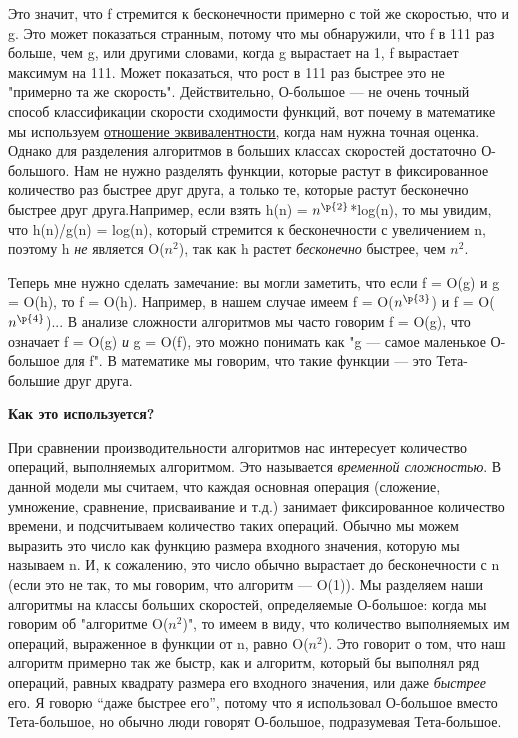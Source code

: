 \vspace{\baselineskip}
Это значит, что f стремится к бесконечности примерно с той же скоростью, что и g. Это может показаться странным, потому что мы обнаружили, что f в 111 раз больше, чем g, или другими словами, когда g вырастает на 1, f вырастает максимум на 111. Может показаться, что рост в 111 раз быстрее это не "примерно та же скорость". Действительно, О-большое --- не очень точный способ классификации скорости сходимости функций, вот почему в математике мы используем \href{https://en.wikipedia.org/wiki/Asymptotic_analysis}{\underline{отношение эквивалентности}}, когда нам нужна точная оценка. Однако для разделения алгоритмов в больших классах скоростей достаточно О-большого. Нам не нужно разделять функции, которые растут в фиксированное количество раз быстрее друг друга, а только те, которые растут бесконечно быстрее друг друга.Например, если взять h(n) = $n^{\p{2}}$*log(n), то мы увидим, что h(n)/g(n) = log(n), который стремится к бесконечности с увеличением n, поэтому h \textit{не} является O($n^{2}$), так как h растет \textit{бесконечно} быстрее, чем $n^{2}$.

\vspace{\baselineskip}
Теперь мне нужно сделать замечание: вы могли заметить, что если f = O(g) и g = O(h), то f = O(h). Например, в нашем случае имеем f = O($n^{\p{3}}$) и f = O($n^{\p{4}}$)... В анализе сложности алгоритмов мы часто говорим f = O(g), что означает f = O(g) \textit{и} g = O(f), это можно понимать как "g --- самое маленькое О-большое для f". В математике мы говорим, что такие функции --- это Тета-большие друг друга.

\vspace{\baselineskip}
\textbf{Как это используется?}

\vspace{\baselineskip}
При сравнении производительности алгоритмов нас интересует количество операций, выполняемых алгоритмом. Это называется \textit{временной сложностью}. В данной модели мы считаем, что каждая основная операция (сложение, умножение, сравнение, присваивание и т.д.) занимает фиксированное количество времени, и подсчитываем количество таких операций. Обычно мы можем выразить это число как функцию размера входного значения, которую мы называем n. И, к сожалению, это число обычно вырастает до бесконечности с n (если это не так, то мы говорим, что алгоритм --- O(1)). Мы разделяем наши алгоритмы на классы больших скоростей, определяемые О-большое: когда мы говорим об "алгоритме O($n^{2}$)", то имеем в виду, что количество выполняемых им операций, выраженное в функции от n, равно O($n^{2}$). Это говорит о том, что наш алгоритм примерно так же быстр, как и алгоритм, который бы выполнял ряд операций, равных квадрату размера его входного значения, или даже \textit{быстрее} его. Я говорю “даже быстрее его”, потому что я использовал О-большое вместо Тета-большое, но обычно люди говорят О-большое, подразумевая Тета-большое.

